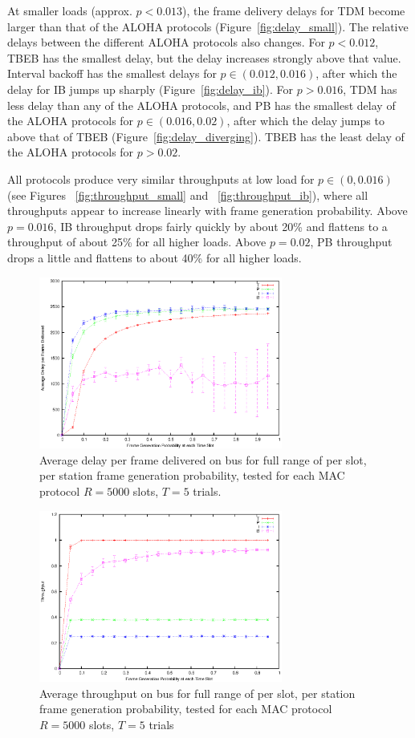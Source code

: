\documentclass[twocolumn]{article}
\begin{document}
At smaller loads (approx. $p<0.013$), the frame delivery delays for TDM become
larger than that of the ALOHA protocols (Figure~\ref{fig:delay_small}). The relative delays 
between the different ALOHA protocols also changes. For $p<0.012$, TBEB has the smallest delay,
but the delay increases strongly above that value. Interval backoff has the smallest delays
for 
$p \in (0.012, 0.016)$, after which the delay for IB jumps up sharply (Figure~\ref{fig:delay_ib}).
For $p > 0.016$, TDM has less delay than any of the ALOHA protocols, and PB has the smallest 
delay of the ALOHA protocols for $p \in (0.016, 0.02)$, after which the delay jumps to above
that of TBEB (Figure~\ref{fig:delay_diverging}). TBEB has the least delay of the ALOHA protocols
for $p > 0.02$.

All protocols produce very similar throughputs at low load for $p \in (0, 0.016)$
(see Figures ~\ref{fig:throughput_small} and ~\ref{fig:throughput_ib}), where
all throughputs appear to increase linearly with frame generation probability. 
Above $p=0.016$, IB throughput drops fairly quickly by about 20\% and flattens to a throughput
of about 25\% for all higher loads. Above $p=0.02$, PB throughput drops a little and flattens
to about 40\% for all higher loads. 

\begin{figure}
    \centering \includegraphics[width=8cm]{plots/fullrange_delay5000.eps}
    \caption{Average delay per frame delivered on bus for full range of per
    slot, per station frame generation probability, tested for each MAC
    protocol  $R=5000$ slots, $T = 5$ trials.}
    \label{fig:fullrange_delay}
\end{figure}

\begin{figure}
    \centering \includegraphics[width=8cm]{plots/fullrange_throughput5000.eps}
    \caption{Average throughput on bus for full range of per
    slot, per station frame generation probability, tested for each MAC
    protocol  $R=5000$ slots, $T = 5$ trials } 
    \label{fig:fullrange_throughput}
\end{figure}
\end{document}
